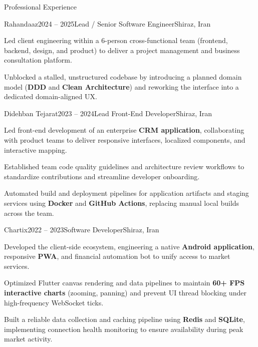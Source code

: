\documentclass[
	a4paper,
	11pt,
]{resume}
\begin{document}
\begin{rSection}{Professional Experience}

    \begin{rSubsection}{Rahandaaz}{2024 -- 2025}{Lead / Senior Software Engineer}{Shiraz, Iran}
        \item Led client engineering within a 6-person cross-functional team (frontend, backend, design, and product) to deliver a project management and business consultation platform.
        \item Unblocked a stalled, unstructured codebase by introducing a planned domain model (\textbf{DDD} and \textbf{Clean Architecture}) and reworking the interface into a dedicated domain-aligned UX.
        \\      
    \end{rSubsection}

    \begin{rSubsection}{Didehban Tejarat}{2023 -- 2024}{Lead Front-End Developer}{Shiraz, Iran}
        \item Led front-end development of an enterprise \textbf{CRM application}, collaborating with product teams to deliver responsive interfaces, localized components, and interactive mapping.
        \item Established team code quality guidelines and architecture review workflows to standardize contributions and streamline developer onboarding.
        \item Automated build and deployment pipelines for application artifacts and staging services using \textbf{Docker} and \textbf{GitHub Actions}, replacing manual local builds across the team.
        \\       
    \end{rSubsection}

    \begin{rSubsection}{Chartix}{2022 -- 2023}{Software Developer}{Shiraz, Iran}
        \item Developed the client-side ecosystem, engineering a native \textbf{Android application}, responsive \textbf{PWA}, and financial automation bot to unify access to market services.
        \item Optimized Flutter canvas rendering and data pipelines to maintain \textbf{60+ FPS interactive charts} (zooming, panning) and prevent UI thread blocking under high-frequency WebSocket ticks.
        \item Built a reliable data collection and caching pipeline using \textbf{Redis} and \textbf{SQLite}, implementing connection health monitoring to ensure availability during peak market activity.
        \\        
    \end{rSubsection}


\end{rSection}
\end{document}
